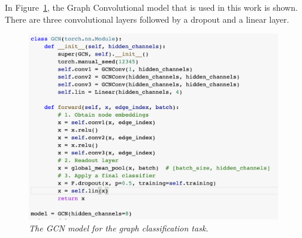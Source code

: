 \documentclass[runningheads]{llncs}
\begin{document}
In Figure~\ref{GNN_model}, the Graph Convolutional model that is used in this work is shown. There are three convolutional layers followed by a dropout and a linear layer. 

%
\begin{figure}[!ht]
  \centering
  \includegraphics[width=11cm]{images/GNN_model.png}
  \caption{\textit{The GCN model for the graph classification task.}}
  \label{GNN_model}
\end{figure}
%
\end{document}

